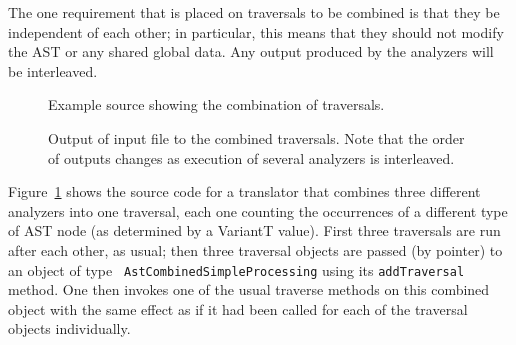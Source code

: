 The one requirement that is placed on traversals to be combined is that they
be independent of each other; in particular, this means that they should not
modify the AST or any shared global data. Any output produced by the analyzers
will be interleaved.

\begin{figure}[!h]
{\indent
{\mySmallFontSize

\begin{latexonly}
   
\end{latexonly}

\begin{htmlonly}
   
\end{htmlonly}

}
}
\caption{Example source showing the combination of traversals.}
\label{Tutorial:exampleCombinedTraversals}
\end{figure}


\begin{figure}[!h]
{\indent
{\mySmallFontSize


\begin{latexonly}
   
\end{latexonly}

\begin{htmlonly}
   
\end{htmlonly}

}
}
\caption{Output of input file to the combined traversals. Note that the order
of outputs changes as execution of several analyzers is interleaved.}
\label{Tutorial:exampleOutput_CombinedTraversals}
\end{figure}

Figure~\ref{Tutorial:exampleCombinedTraversals} shows the source code for a
translator that combines three different analyzers into one traversal, each
one counting the occurrences of a different type of AST node (as determined by
a VariantT value). First three traversals are run after each other, as usual;
then three traversal objects are passed (by pointer) to an object of type {\tt
AstCombinedSimpleProcessing} using its {\tt addTraversal} method. One then
invokes one of the usual traverse methods on this combined object with the
same effect as if it had been called for each of the traversal objects
individually.

